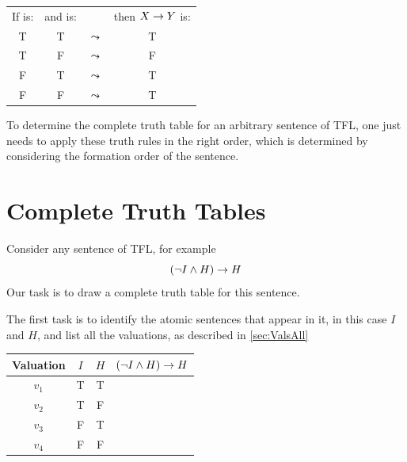 \begin{highlighted}
\begin{center}
			\begin{tabular}{cccc}
				If \metaX is:&and \metaY is:&&then $X\rightarrow Y$ is:\\
				T & T &$\leadsto$& T\\
				T & F &$\leadsto$& F\\
				F & T &$\leadsto$& T\\
				F & F &$\leadsto$& T
			\end{tabular}
		\end{center}
\end{highlighted}

To determine the complete truth table for an arbitrary sentence of TFL, one just needs to apply these truth rules in the right order, which is determined by considering the formation order of the sentence. 

\section{Complete Truth Tables}

Consider any sentence of TFL, for example $$(\neg I\mathbin{\wedge} H)\rightarrow H$$
Our task is to draw a complete truth table for this sentence. 

The first task is to identify the atomic sentences that appear in it, in this case $I$ and $H$, and list all the valuations, as described in \cref{sec:ValsAll}

\begin{center}
	\begin{tabular}{ccc|c}
		Valuation&$I$&$H$&$(\neg I\mathbin{\wedge} H)\rightarrow H$\\\hline
		$v_1$&T&T&\\
		$v_2$&T&F&\\
		$v_3$&F&T&\\
		$v_4$&F&F&
	\end{tabular}
\end{center}

